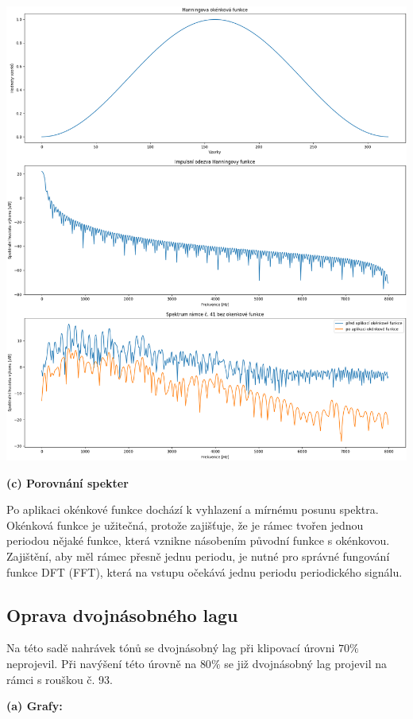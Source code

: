 \documentclass[12pt]{article}
\begin{document}
\includegraphics[scale=0.44]{ukol11.png}

\textbf{(c) Porovnání spekter}

\hspace{1.5em}Po aplikaci okénkové funkce dochází k vyhlazení a mírnému posunu spektra. Okénková funkce je užitečná, protože zajišťuje, že je rámec tvořen jednou periodou nějaké funkce, která vznikne násobením původní funkce s okénkovou. Zajištění, aby měl rámec přesně jednu periodu, je nutné pro správné fungování funkce DFT (FFT), která na vstupu očekává jednu periodu periodického signálu.

\subsection{Oprava dvojnásobného lagu}
\hspace{1.5em}Na této sadě nahrávek tónů se dvojnásobný lag při klipovací úrovni $70\%$ neprojevil. Při navýšení této úrovně na $80\%$ se již dvojnásobný lag projevil na rámci s rouškou č. 93.

\vspace{1em}
\textbf{(a) Grafy:}
\end{document}
